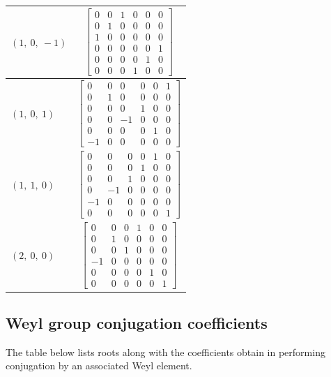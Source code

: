 \documentclass[11pt]{article}
\theoremstyle{definition}
\begin{document}
\begin{longtable}{|l|c|}
    \hline
    $\left( 1, \  0, \  -1\right)$ & ${\left[\begin{matrix}0 & 0 & 1 & 0 & 0 & 0\\0 & 1 & 0 & 0 & 0 & 0\\1 & 0 & 0 & 0 & 0 & 0\\0 & 0 & 0 & 0 & 0 & 1\\0 & 0 & 0 & 0 & 1 & 0\\0 & 0 & 0 & 1 & 0 & 0\end{matrix}\right]}$ \\
    \hline
    $\left( 1, \  0, \  1\right)$ & ${\left[\begin{matrix}0 & 0 & 0 & 0 & 0 & 1\\0 & 1 & 0 & 0 & 0 & 0\\0 & 0 & 0 & 1 & 0 & 0\\0 & 0 & -1 & 0 & 0 & 0\\0 & 0 & 0 & 0 & 1 & 0\\-1 & 0 & 0 & 0 & 0 & 0\end{matrix}\right]}$ \\
    \hline
    $\left( 1, \  1, \  0\right)$ & ${\left[\begin{matrix}0 & 0 & 0 & 0 & 1 & 0\\0 & 0 & 0 & 1 & 0 & 0\\0 & 0 & 1 & 0 & 0 & 0\\0 & -1 & 0 & 0 & 0 & 0\\-1 & 0 & 0 & 0 & 0 & 0\\0 & 0 & 0 & 0 & 0 & 1\end{matrix}\right]}$ \\
    \hline
    $\left( 2, \  0, \  0\right)$ & ${\left[\begin{matrix}0 & 0 & 0 & 1 & 0 & 0\\0 & 1 & 0 & 0 & 0 & 0\\0 & 0 & 1 & 0 & 0 & 0\\-1 & 0 & 0 & 0 & 0 & 0\\0 & 0 & 0 & 0 & 1 & 0\\0 & 0 & 0 & 0 & 0 & 1\end{matrix}\right]}$ \\
    \hline
\end{longtable}


\subsection{Weyl group conjugation coefficients}

The table below lists roots along with the coefficients obtain in performing conjugation by an associated Weyl element.
\end{document}
